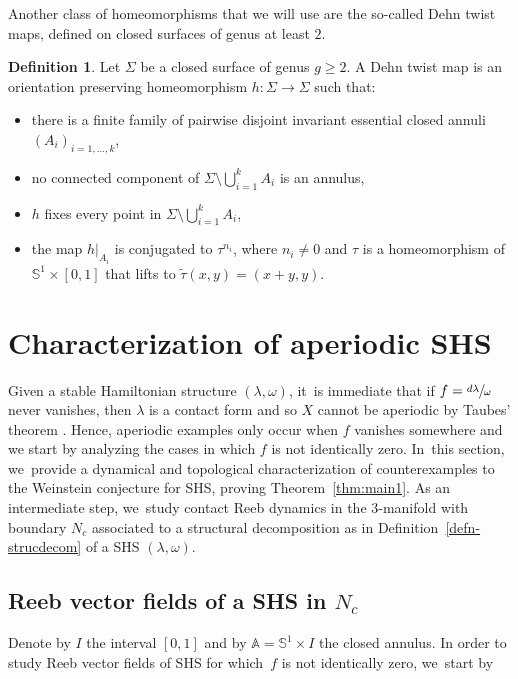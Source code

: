 \documentclass[JEP,XML,SOM,Unicode,NoEqCountersInSection,NoFloatCountersInSection,published]{cedram}
\newcommand{\threemanifold}{$3$\nobreakdash-mani\-fold\xspace}
\theoremstyle{definition}
\newtheorem{defi}[theorem]{Definition}
\newcommand{\mS}{\mathbb{S}}
\begin{document}
Another class of homeomorphisms that we will use are the so-called Dehn twist maps, defined on closed surfaces of genus at least $2$.
\begin{defi}
Let $\Sigma$ be a closed surface of genus $g\geq 2$. A Dehn twist map is an orientation preserving homeomorphism $h:\Sigma \to \Sigma$ such that:
\begin{itemize}
\item
there is a finite family of pairwise disjoint invariant essential closed annuli $(A_i)_{i=1,\dots,k}$,
\item
no connected component of $\Sigma\setminus \bigcup_{i=1}^k A_i$ is an annulus,
\item
$h$ fixes every point in $\Sigma \setminus \bigcup_{i=1}^k A_i$,
\item
the map $h|_{A_i}$ is conjugated to $\tau^{n_i}$, where $n_i\neq 0$ and $\tau$ is a homeomorphism of $\mS^1\times [0,1]$ that lifts to $\widetilde \tau (x,y)=(x+y,y)$.
\end{itemize}
\end{defi}

\section{Characterization of aperiodic SHS}\label{s:Aper}

Given a stable Hamiltonian structure $(\lambda,\omega)$, it~is immediate that if $f=\sfrac{d\lambda}{\omega}$ never vanishes, then $\lambda$ is a contact form and so $X$ cannot be aperiodic by Taubes' theorem \cite{Taub}. Hence, aperiodic examples only occur when $f$ vanishes somewhere and we start by analyzing the cases in which $f$ is not identically zero. In~this section, we~provide a dynamical and topological characterization of counterexamples to the Weinstein conjecture for SHS, proving Theorem~\ref{thm:main1}. As an intermediate step, we~study contact Reeb dynamics in the \threemanifold with boundary $N_c$ associated to a structural decomposition as in Definition~\ref{defn-strucdecom} of a SHS $(\lambda,\omega)$.

\subsection{Reeb vector fields of a SHS in $N_c$}

Denote by $I$ the interval $[0,1]$ and by $\mathbb{A}=\mS^1\times I$ the closed annulus.
In order to study Reeb vector fields of SHS for which~$f$ is not identically zero, we~start by
\end{document}
